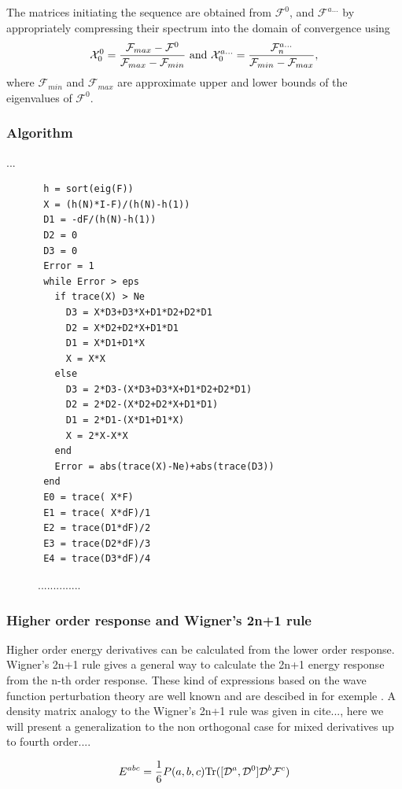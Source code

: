 \documentclass[prl,aps,twocolumn,showpacs,twocolumngrid,superbib]{revtex4}
\def\Tr{{\rm Tr}}
\def\F{\mathcal{F}}
\def\D{\mathcal{D}}
\def\X{\mathcal{X}}
\begin{document}
The matrices initiating the sequence are obtained from $\F^0$,
and $\F^{a\ldots}$ by appropriately
compressing their spectrum into the domain of convergence
\cite{ANiklasson02A} using
\begin{equation}
  \X^0_{0}=\frac{\F_{max}-\F^0}{\F_{max}-\F_{min}}~{\rm and}~
  \X^{a\ldots}_{0}=\frac{\F^{a\ldots}_{n}}{\F_{min}-\F_{max}},
\end{equation}
where $\F_{min}$ and $\F_{max}$ are approximate upper and lower 
bounds of the eigenvalues of $\F^0$.



\subsubsection{Algorithm}
...\\
\begin{figure}[htbp]
  \centering
  \caption{\protect
    ..............
  }\label{fig:algo}
\begin{verbatim}
 h = sort(eig(F))
 X = (h(N)*I-F)/(h(N)-h(1))
 D1 = -dF/(h(N)-h(1))
 D2 = 0
 D3 = 0
 Error = 1
 while Error > eps
   if trace(X) > Ne
     D3 = X*D3+D3*X+D1*D2+D2*D1
     D2 = X*D2+D2*X+D1*D1
     D1 = X*D1+D1*X
     X = X*X
   else
     D3 = 2*D3-(X*D3+D3*X+D1*D2+D2*D1)
     D2 = 2*D2-(X*D2+D2*X+D1*D1)
     D1 = 2*D1-(X*D1+D1*X)
     X = 2*X-X*X
   end
   Error = abs(trace(X)-Ne)+abs(trace(D3))
 end
 E0 = trace( X*F)
 E1 = trace( X*dF)/1
 E2 = trace(D1*dF)/2
 E3 = trace(D2*dF)/3
 E4 = trace(D3*dF)/4
\end{verbatim}
\end{figure}


\subsubsection{Higher order response and Wigner's 2n+1 rule }
Higher order energy derivatives can be calculated from the lower
order response. Wigner's 2n+1 rule gives a general way to calculate the 2n+1
energy response from the n-th order response. These kind of expressions
based on the wave function perturbation theory are well known and are 
descibed in for exemple \cite{Dupuis_1991}.
A density matrix analogy to 
the Wigner's 2n+1 rule was given in cite{...}, here we will present
a generalization to the non orthogonal case for mixed derivatives 
up to fourth order....



\begin{equation}
  E^{abc}=\frac{1}{6}P(a,b,c)\Tr([\D^a,\D^0]\D^b\F^c)
\end{equation}
\end{document}
